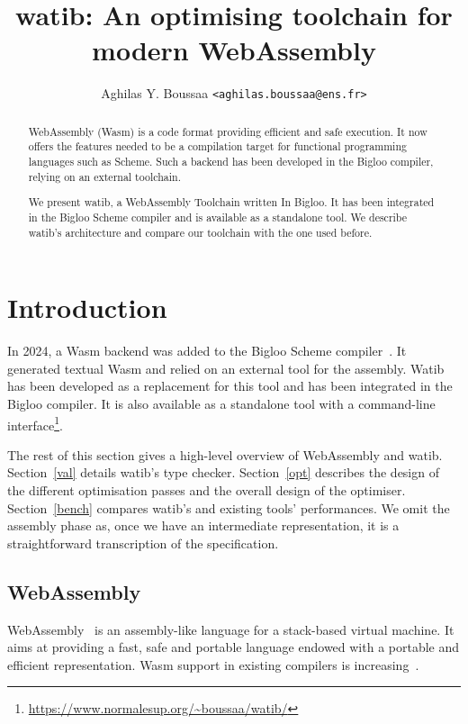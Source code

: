 \documentclass[a4paper,11pt]{article}
\author{Aghilas Y. Boussaa \texttt{<aghilas.boussaa@ens.fr>}}
\title{\textsf{watib}: An optimising toolchain for modern WebAssembly}
\begin{document}
\sloppy
\maketitle
\begin{abstract}
  WebAssembly (Wasm) is a code format providing efficient and safe execution.
  It now offers the features needed to be a compilation target for functional
  programming languages such as Scheme. Such a backend has been developed in
  the Bigloo compiler, relying on an external toolchain.

  We present \textsf{watib}, a WebAssembly Toolchain written In Bigloo. It has
  been integrated in the Bigloo Scheme compiler and is available as a standalone
  tool. We describe \textsf{watib}'s architecture and compare our toolchain with
  the one used before.
\end{abstract}

\section{Introduction}
In 2024, a Wasm backend was added to the Bigloo Scheme compiler~\cite{Bigloo}.
It generated textual Wasm and relied on an external tool for the assembly.
\textsf{Watib} has been developed as a replacement for this tool and has been
integrated in the Bigloo compiler. It is also available as a standalone tool
with a command-line
interface\footnote{\url{https://www.normalesup.org/~boussaa/watib/}}.

The rest of this section gives a high-level overview of WebAssembly and
\textsf{watib}. Section~\ref{val} details \textsf{watib}'s type checker.
Section~\ref{opt} describes the design of the different optimisation passes and
the overall design of the optimiser. Section~\ref{bench} compares
\textsf{watib}'s and existing tools' performances. We omit the assembly phase
as, once we have an intermediate representation, it is a straightforward
transcription of the specification.
\subsection{WebAssembly}
WebAssembly~\cite{haas2017bringing} is an assembly-like language for a
stack-based virtual machine. It aims at providing a fast, safe and portable
language endowed with a portable and efficient representation. Wasm support in
existing compilers is increasing~\cite{emscripten, kotlin, ocaml}.
\end{document}
